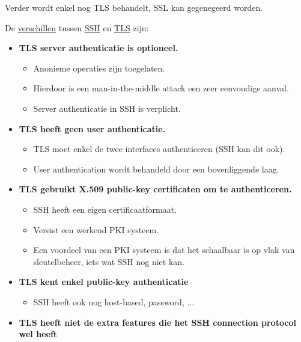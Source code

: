 \documentclass{report}
\begin{document}
	Verder wordt enkel nog TLS behandelt, SSL kan gegenegeerd worden.

	De \underline{verschillen} tussen \underline{SSH} en \underline{TLS} zijn:
	\begin{itemize}
		\item \textbf{TLS server authenticatie is optioneel.} 
			\begin{itemize}
				\item Anonieme operaties zijn toegelaten.
				\item Hierdoor is een man-in-the-middle attack een zeer eenvoudige aanval.
				\item Server authenticatie in SSH is verplicht.
			\end{itemize}
		\item \textbf{TLS heeft geen user authenticatie.}
			\begin{itemize}
				\item TLS moet enkel de twee interfaces authenticeren (SSH kan dit ook).
				\item User authentication wordt behandeld door een bovenliggende laag.
			\end{itemize}
		\item \textbf{TLS gebruikt X.509 public-key certificaten om te authenticeren.}
			\begin{itemize}
				\item SSH heeft een eigen certificaatformaat.
				\item Vereist een werkend PKI systeem.
				\item Een voordeel van een PKI systeem is dat het schaalbaar is op vlak van sleutelbeheer, iets wat SSH nog niet kan. 
			\end{itemize}
		\item \textbf{TLS kent enkel public-key authenticatie}
			\begin{itemize}
				\item SSH heeft ook nog host-based, password, ...
			\end{itemize}
		\item \textbf{TLS heeft niet de extra features die het SSH connection protocol wel heeft} 
	\end{itemize}
\end{document}
